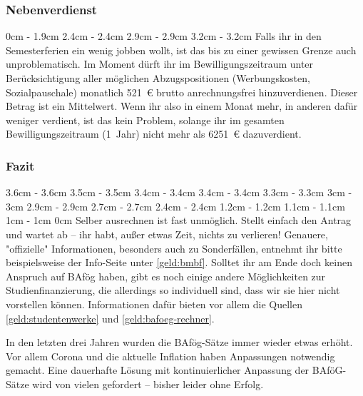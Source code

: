 \begin{multicols}{2}
\subsubsection{Nebenverdienst}
0cm \columnwidth
0cm \columnwidth
0cm \columnwidth
0cm \columnwidth
0cm \columnwidth
0cm \columnwidth
0cm \columnwidth
0cm \columnwidth
1.9cm	\dimexpr\columnwidth - 1.9cm
2.4cm	\dimexpr\columnwidth - 2.4cm
2.9cm	\dimexpr\columnwidth - 2.9cm
3.2cm	\dimexpr\columnwidth - 3.2cm
Falls ihr in den Semesterferien ein wenig jobben wollt, ist das bis zu einer gewissen Grenze auch unproblematisch.
Im Moment dürft ihr im Bewilligungszeitraum unter Berücksichtigung aller möglichen Abzugspositionen (Werbungskosten, Sozialpauschale) monatlich \SI{521}{\euro} brutto anrechnungsfrei hinzuverdienen.
Dieser Betrag ist ein Mittelwert.
Wenn ihr also in einem Monat mehr, in anderen dafür weniger verdient, ist das kein Problem, solange ihr im gesamten Bewilligungszeitraum (1~Jahr) nicht mehr als \SI{6251}{\euro} dazuverdient.

\subsubsection{Fazit}
3.6cm	\dimexpr\columnwidth - 3.6cm
3.5cm	\dimexpr\columnwidth - 3.5cm
3.4cm	\dimexpr\columnwidth - 3.4cm
3.4cm	\dimexpr\columnwidth - 3.4cm
3.3cm	\dimexpr\columnwidth - 3.3cm
3cm	\dimexpr\columnwidth - 3cm
2.9cm	\dimexpr\columnwidth - 2.9cm
2.7cm	\dimexpr\columnwidth - 2.7cm
2.4cm	\dimexpr\columnwidth - 2.4cm
1.2cm	\dimexpr\columnwidth - 1.2cm
1.1cm	\dimexpr\columnwidth - 1.1cm
1cm	\dimexpr\columnwidth - 1cm
0cm \columnwidth
0cm \columnwidth
0cm \columnwidth
Selber ausrechnen ist fast unmöglich.
Stellt einfach den Antrag und wartet ab -- ihr habt, außer etwas Zeit, nichts zu verlieren! Genauere, "offizielle" Informationen, besonders auch zu Sonderfällen, entnehmt ihr bitte beispielsweise der Info-Seite unter \cref{geld:bmbf}. Solltet ihr am Ende doch keinen Anspruch auf BAfög haben, gibt es noch einige andere Möglichkeiten zur Studienfinanzierung, die allerdings so individuell sind, dass wir sie hier nicht vorstellen können. Informationen dafür bieten vor allem die Quellen \cref{geld:studentenwerke} und \cref{geld:bafoeg-rechner}. 

In den letzten drei Jahren wurden die BAfög-Sätze immer wieder etwas erhöht. Vor allem Corona und die aktuelle Inflation haben Anpassungen notwendig gemacht.
Eine dauerhafte Lösung mit kontinuierlicher Anpassung der BAföG-Sätze wird von vielen gefordert -- bisher leider ohne Erfolg.


\end{multicols}
